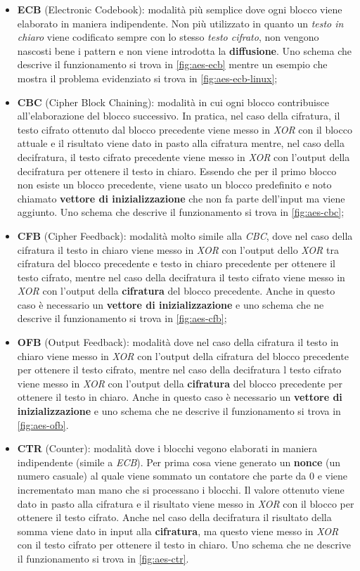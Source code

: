\begin{itemize}
    \item \textbf{ECB} (Electronic Codebook): modalità più semplice dove ogni blocco viene elaborato in maniera indipendente. Non più utilizzato in quanto un \emph{testo in chiaro} viene codificato sempre con lo stesso \emph{testo cifrato}, non vengono nascosti bene i pattern e non viene introdotta la \textbf{diffusione}. Uno schema che descrive il funzionamento si trova in \autoref{fig:aes-ecb} mentre un esempio che mostra il problema evidenziato si trova in \autoref{fig:aes-ecb-linux};
    \item \textbf{CBC} (Cipher Block Chaining): modalità in cui ogni blocco contribuisce all'elaborazione del blocco successivo. In pratica, nel caso della cifratura, il testo cifrato ottenuto dal blocco precedente viene messo in \emph{XOR} con il blocco attuale e il risultato viene dato in pasto alla cifratura mentre, nel caso della decifratura, il testo cifrato precedente viene messo in \emph{XOR} con l'output della decifratura per ottenere il testo in chiaro. Essendo che per il primo blocco non esiste un blocco precedente, viene usato un blocco predefinito e noto chiamato \textbf{vettore di inizializzazione} che non fa parte dell'input ma viene aggiunto. Uno schema che descrive il funzionamento si trova in \autoref{fig:aes-cbc};
    \item \textbf{CFB} (Cipher Feedback): modalità molto simile alla \emph{CBC}, dove nel caso della cifratura il testo in chiaro viene messo in \emph{XOR} con l'output dello \emph{XOR} tra cifratura del blocco precedente e testo in chiaro precedente per ottenere il testo cifrato, mentre nel caso della decifratura il testo cifrato viene messo in \emph{XOR} con l'output della \textbf{cifratura} del blocco precedente. Anche in questo caso è necessario un \textbf{vettore di inizializzazione} e uno schema che ne descrive il funzionamento si trova in \autoref{fig:aes-cfb};
    \item \textbf{OFB} (Output Feedback): modalità dove nel caso della cifratura il testo in chiaro viene messo in \emph{XOR} con l'output della cifratura del blocco precedente per ottenere il testo cifrato, mentre nel caso della decifratura l testo cifrato viene messo in \emph{XOR} con l'output della \textbf{cifratura} del blocco precedente per ottenere il testo in chiaro. Anche in questo caso è necessario un \textbf{vettore di inizializzazione} e uno schema che ne descrive il funzionamento si trova in \autoref{fig:aes-ofb}.
    \item \textbf{CTR} (Counter): modalità dove i blocchi vegono elaborati in maniera indipendente (simile a \emph{ECB}). Per prima cosa viene generato un \textbf{nonce} (un numero casuale) al quale viene sommato un contatore che parte da 0 e viene incrementato man mano che si processano i blocchi. Il valore ottenuto viene dato in pasto alla cifratura e il risultato viene messo in \emph{XOR} con il blocco per ottenere il testo cifrato. Anche nel caso della decifratura il risultato della somma viene dato in input alla \textbf{cifratura}, ma questo viene messo in \emph{XOR} con il testo cifrato per ottenere il testo in chiaro. Uno schema che ne descrive il funzionamento si trova in \autoref{fig:aes-ctr}. \cite{wikipedia_aes_modes}

\end{itemize}
